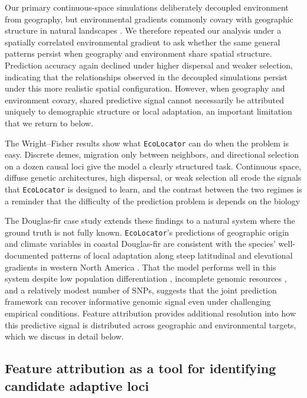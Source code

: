 \documentclass[]{article}
\newcommand{\dfir}{Douglas-fir\xspace}
\newcommand{\ecolocator}{\texttt{EcoLocator}\xspace}
\begin{document}
Our primary continuous-space simulations deliberately decoupled
environment from geography, but environmental gradients commonly
covary with geographic structure in natural landscapes
\citep{meirmans_ibd_2012}.
We therefore repeated our analysis under a spatially correlated
environmental gradient to ask whether the same general patterns
persist when geography and environment share spatial structure.
Prediction accuracy again declined under higher dispersal
and weaker selection, indicating that the relationships observed
in the decoupled simulations persist under this more realistic
spatial configuration.
However, when geography and environment covary,
shared predictive signal cannot necessarily be attributed uniquely
to demographic structure or local adaptation,
an important limitation that we return to below.

The Wright--Fisher results show what \ecolocator can do
when the problem is easy.
Discrete demes, migration only between neighbors,
and directional selection on a dozen causal loci
give the model a clearly structured task.
Continuous space, diffuse genetic architectures,
high dispersal, or weak selection all erode the signals
that \ecolocator is designed to learn,
and the contrast between the two regimes is a reminder that
the difficulty of the prediction problem is depends on the biology

The \dfir case study extends these findings to a natural 
system where the ground truth is not fully known. 
\ecolocator's predictions of geographic origin and 
climate variables in coastal \dfir are consistent with the 
species' well-documented patterns of local adaptation along steep 
latitudinal and elevational gradients in western 
North America \citep{aitken_assisted_2013}. 
That the model performs well in this system
despite low population differentiation \citep{krutovsky_estimation_2009}, 
incomplete genomic resources \citep{neale_douglas-fir_2017}, 
and a relatively modest number of SNPs, 
suggests that the joint prediction framework can recover 
informative genomic signal even under challenging empirical conditions. 
Feature attribution provides additional resolution into how this 
predictive signal is distributed across geographic and environmental
targets, which we discuss in detail below.


\subsection{Feature attribution as a tool for identifying candidate adaptive loci}
\end{document}
